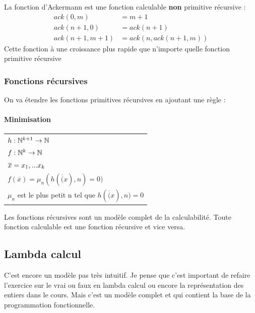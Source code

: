 \begin{myexem}
	La fonction d'Ackermann est une fonction calculable \textbf{non} 
	primitive récursive :
	\begin{align}
		ack(0,m) &= m+1 \\
		ack(n+1,0) &= ack(n+1)\\
		ack(n+1,m+1) &= ack(n, ack(n+1,m))
	\end{align}
	Cette fonction à une croissance plus rapide que n'importe quelle fonction 
	primitive récursive
\end{myexem}


\subsubsection{Fonctions récursives}
\label{ssub:fonctions_r_cursives}
On va étendre les fonctions primitives récursives en ajoutant une règle :

\paragraph{Minimisation}
\begin{tabular}{|l|}
	\hline
	$h: \mathbb{N}^{k+1} \rightarrow \mathbb{N}$\\
	$f: \mathbb{N}^{k} \rightarrow \mathbb{N}$\\
	$\overline{x} =x_1,...x_k$ \\
	$f(\overline{x}) = \mu_n (h(\overline(x), n) =0)$\\
	$\mu_n$ est le plus petit n tel que $h(\overline(x), n) =0$ \\
	\hline
\end{tabular}

\begin{myprop}
	Les fonctions récursives sont un modèle complet de la calculabilité. 
	Toute fonction calculable est une fonction récursive et vice versa.
\end{myprop}

\subsection{Lambda calcul}
\label{sub:lambda_calcul}
\begin{myrem}
	C'est encore un modèle pas très intuitif. Je pense que c'est important 
	de refaire l'exercice sur le vrai ou faux en lambda calcul ou encore la 
	représentation des entiers dans le cours. Mais c'est un modèle complet 
	et qui contient la base de la programmation fonctionnelle.
\end{myrem}


